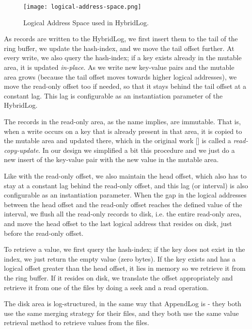 \begin{figure}[h]
    \centering
    \texttt{[image: logical-address-space.png]}
    \caption{Logical Address Space used in HybridLog.}
    \label{fig:logical-address-space}
\end{figure}

As records are written to the HybridLog, we first insert them to the tail of the ring buffer, we update the hash-index, and we move the tail offset further.
At every write, we also query the hash-index; if a key exists already in the mutable area, it is updated \textit{in-place}.
As we write new key-value pairs and the mutable area grows (because the tail offset moves towards higher logical addresses), we move the read-only offset too if needed, so that it stays behind the tail offset at a constant lag. This lag is configurable as an instantiation parameter of the HybridLog.

The records in the read-only area, as the name implies, are immutable. That is, when a write occurs on a key that is already present in that area, it is copied to the mutable area and updated there, which in the original work [\cite{faster}] is called a \textit{read-copy-update}. In our design we simplified a bit this procedure and we just do a new insert of the key-value pair with the new value in the mutable area.

Like with the read-only offset, we also maintain the head offset, which also has to stay at a constant lag behind the read-only offset, and this lag (or interval) is also configurable as an instantiation parameter.
When the gap in the logical addresses between the head offset and the read-only offset reaches the defined value of the interval, we flush all the read-only records to disk, i.e. the entire read-only area, and move the head offset to the last logical address that resides on disk, just before the read-only offset.

To retrieve a value, we first query the hash-index; if the key does not exist in the index, we just return the empty value (zero bytes). If the key exists and has a logical offset greater than the head offset, it lies in memory so we retrieve it from the ring buffer. If it resides on disk, we translate the offset appropriately and retrieve it from one of the files by doing a seek and a read operation.

The disk area is log-structured, in the same way that AppendLog is - they both use the same merging strategy for their files, and they both use the same value retrieval method to retrieve values from the files.

